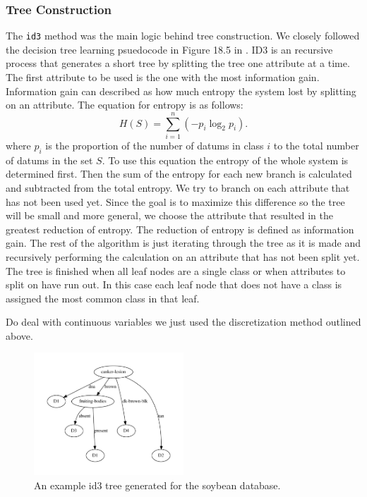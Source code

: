\documentclass{article}
\begin{document}
	\subsubsection{Tree Construction}
	The \texttt{id3} method was the main logic behind tree construction. We closely followed the decision tree learning psuedocode in Figure 18.5 in \cite{ai}. 
	ID3 is an recursive process that generates a short tree by splitting the tree one attribute at a time. 
	The first attribute to be used is the one with the most information gain. 
	Information gain can described as how much entropy the system lost by splitting on an attribute. 
	The equation for entropy is as follows:
	\begin{equation*}
		H(S) = \sum_{i=1}^{n} \left( -p_i \log_2 p_i \right). 
	\end{equation*}		
	where $p_i$ is the proportion of the number of datums in class $i$ to the total number of datums in the set $S$. 
	To use this equation the entropy of the whole system is determined first. 
	Then the sum of the entropy for each new branch is calculated and subtracted from the total entropy. We try to branch on each attribute that has not been used yet. Since the goal is to maximize this difference so the tree will be small and more general, we choose the attribute that resulted in the greatest reduction of entropy. The reduction of entropy is defined as information gain.
	The rest of the algorithm is just iterating through the tree as it is made and recursively performing the calculation on an attribute that has not been split yet. 
	The tree is finished when all leaf nodes are a single class or when attributes to split on have run out.
	In this case each leaf node that does not have a class is assigned the most common class in that leaf.
	
	Do deal with continuous variables we just used the discretization method outlined above.
	
	\begin{figure}[h]
		\centering
		\includegraphics[width=0.5\textwidth]{figs/ID3/soybean}
		\caption{An example id3 tree generated for the soybean database.}
		\label{tan}
	\end{figure}
\end{document}
